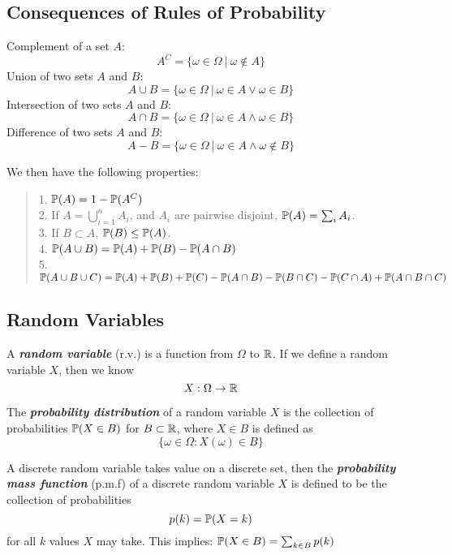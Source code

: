 \subsection{Consequences of Rules of Probability}
\begin{definition}
    Complement of a set $A$:
    $$A^C = \{\omega \in \Omega \ | \ \omega \notin A\}$$
    Union of two sets $A$ and $B$:
    $$A \cup B = \{\omega \in \Omega \ | \ \omega \in A \lor \omega \in B\}$$
    Intersection of two sets $A$ and $B$:
    $$A \cap B = \{\omega \in \Omega \ | \ \omega \in A \land \omega \in B\}$$
    Difference of two sets $A$ and $B$:
    $$A - B = \{\omega \in \Omega \ | \ \omega \in A \land \omega \notin B\}$$
\end{definition}
We then have the following properties:
\begin{quote}
    1. $\mathbb{P}(A) = 1 - \mathbb{P}(A^C)$ \\
    2. If $A = \bigcup_{i = 1}^n A_i$, and $A_i$ are pairwise disjoint, $\mathbb{P}(A) = \sum_{i} A_i$. \\
    3. If $B \subset A$, $\mathbb{P}(B) \le \mathbb{P}(A)$. \\
    4. $\mathbb{P}(A \cup B) = \mathbb{P}(A) + \mathbb{P}(B) - \mathbb{P}(A \cap B)$ \\
    5. $\mathbb{P}(A \cup B \cup C) = \mathbb{P}(A) + \mathbb{P}(B) + \mathbb{P}(C) - \mathbb{P}(A \cap B) - \mathbb{P}(B \cap C) - \mathbb{P}(C \cap A) + \mathbb{P}(A \cap B \cap C)$
\end{quote}

\subsection{Random Variables}
\begin{definition}
    A \textbf{\textit{random variable}} (r.v.) is a function from $\Omega$ to $\mathbb{R}$. If we define a random variable $X$, then we know
    $$X: \Omega \to \mathbb{R}$$
\end{definition}
\begin{definition}
    The \textbf{\textit{probability distribution}} of a random variable $X$ is the collection of probabilities $\mathbb{P}(X \in B)$ for $B \subset \mathbb{R}$, where $X \in B$ is defined as
    $$\{\omega \in \Omega: X(\omega) \in B\}$$
\end{definition}
A discrete random variable takes value on a discrete set, then the \textbf{\textit{probability mass function}} (p.m.f) of a discrete random variable $X$ is defined to be the collection of probabilities
$$p(k) = \mathbb{P}(X = k)$$
for all $k$ values $X$ may take. This implies: $\mathbb{P}(X \in B) = \sum_{k \in B} p(k)$
\newpage